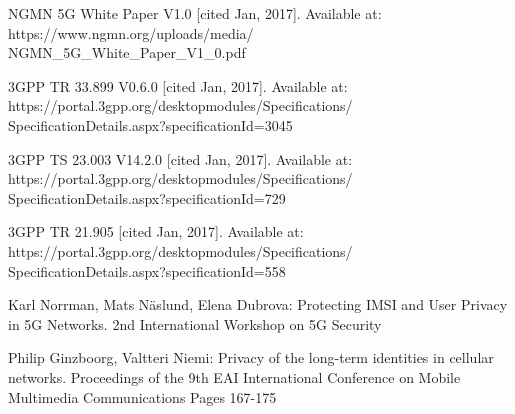 \documentclass[runningheads,a4paper]{llncs} %
\begin{document}
\begin{thebibliography}{4}

 NGMN 5G White Paper V1.0 [cited Jan, 2017]. Available at: https://www.ngmn.org/uploads/media/\\NGMN\_5G\_White\_Paper\_V1\_0.pdf

 3GPP TR 33.899 V0.6.0 [cited Jan, 2017]. Available at: https://portal.3gpp.org/desktopmodules/Specifications/\\SpecificationDetails.aspx?specificationId=3045

 3GPP TS 23.003 V14.2.0 [cited Jan, 2017]. Available at: https://portal.3gpp.org/desktopmodules/Specifications/\\SpecificationDetails.aspx?specificationId=729

 3GPP TR 21.905 [cited Jan, 2017]. Available at: https://portal.3gpp.org/desktopmodules/Specifications/\\SpecificationDetails.aspx?specificationId=558


 Karl Norrman, Mats N\"aslund, Elena Dubrova: Protecting IMSI and User Privacy in 5G Networks. 2nd International Workshop on 5G Security

 Philip Ginzboorg,  Valtteri Niemi: Privacy of the long-term identities in cellular networks. Proceedings of the 9th EAI International Conference on Mobile Multimedia Communications
Pages 167-175




\end{thebibliography}
\end{document}
